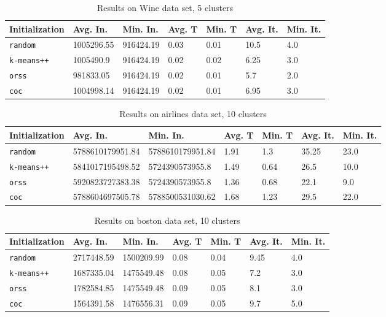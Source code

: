 \documentclass[twoside, 11pt]{article}
\begin{document}
		\begin{table}[p]
			\begin{center}
				\begin{tabular}{|l|l|l|l|l|l|l|}
					\hline
					Initialization & Avg. In. & Min. In. & Avg. T & Min. T & Avg. It. & Min. It.\\\hline
					\texttt{random} & 1005296.55 & 916424.19 & 0.03 & 0.01 & 10.5 & 4.0\\\hline
					\texttt{k-means++} & 1005490.9 & 916424.19 & 0.02 & 0.02 & 6.25 & 3.0\\\hline
					\texttt{orss} & 981833.05 & 916424.19 & 0.02 & 0.01 & 5.7 & 2.0\\\hline
					\texttt{coc} & 1004998.14 & 916424.19 & 0.02 & 0.01 & 6.95 & 3.0\\\hline
				\end{tabular}
				\caption{Results on Wine data set, 5 clusters}
				\label{tbl:Wine5}
			\end{center}
		\end{table}
		
		\begin{table}[p]
			\begin{center}
				\begin{tabular}{|l|l|l|l|l|l|l|}
					\hline
					Initialization & Avg. In. & Min. In. & Avg. T & Min. T & Avg. It. & Min. It.\\\hline
					\texttt{random} & 5788610179951.84 & 5788610179951.84 & 1.91 & 1.3 & 35.25 & 23.0\\\hline
					\texttt{k-means++} & 5841017195498.52 & 5724390573955.8 & 1.49 & 0.64 & 26.5 & 10.0\\\hline
					\texttt{orss} & 5920823727383.38 & 5724390573955.8 & 1.36 & 0.68 & 22.1 & 9.0\\\hline
					\texttt{coc} & 5788604697505.78 & 5788500531030.62 & 1.68 & 1.23 & 29.5 & 22.0\\\hline
				\end{tabular}
				\caption{Results on airlines data set, 10 clusters}
				\label{tbl:airlines10}
			\end{center}
		\end{table}
		
		\begin{table}[p]
			\begin{center}
				\begin{tabular}{|l|l|l|l|l|l|l|}
					\hline
					Initialization & Avg. In. & Min. In. & Avg. T & Min. T & Avg. It. & Min. It.\\\hline
					\texttt{random} & 2717448.59 & 1500209.99 & 0.08 & 0.04 & 9.45 & 4.0\\\hline
					\texttt{k-means++} & 1687335.04 & 1475549.48 & 0.08 & 0.05 & 7.2 & 3.0\\\hline
					\texttt{orss} & 1782584.85 & 1475549.48 & 0.09 & 0.05 & 8.1 & 3.0\\\hline
					\texttt{coc} & 1564391.58 & 1476556.31 & 0.09 & 0.05 & 9.7 & 5.0\\\hline
				\end{tabular}
				\caption{Results on boston data set, 10 clusters}
				\label{tbl:boston10}
			\end{center}
		\end{table}
		
\end{document}
